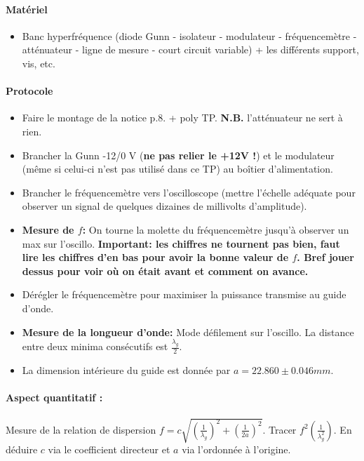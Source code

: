 \documentclass[11pt]{report}
\numberwithin{figure}{section}
\numberwithin{equation}{section}
\numberwithin{table}{section}
\newcommand{\1}{\boldsymbol{1}}
\begin{document}
\begin{tcolorbox}[breakable, enhanced, colback=red!2!white,colframe=mycolor!85!black,title=\textbf{\textbf{Expérience}}]
\paragraph*{Matériel}
\begin{itemize}
\item Banc hyperfréquence (diode Gunn - isolateur - modulateur - fréquencemètre - atténuateur - ligne de mesure - court circuit variable) + les différents support, vis, etc.
\end{itemize}

\paragraph*{Protocole } 

\begin{itemize}[label=$\triangleright$]
\item Faire le montage de la notice p.8. + poly TP. \textbf{N.B.} l'atténuateur ne sert à rien.
\item Brancher la Gunn -12/0 V (\textbf{ne pas relier le +12V !}) et le modulateur (même si celui-ci n'est pas utilisé dans ce TP) au boîtier d'alimentation. 
\item Brancher le fréquencemètre vers l'oscilloscope (mettre l'échelle adéquate pour observer un signal de quelques dizaines de millivolts d'amplitude).
\item \textbf{Mesure de $f$:} On tourne la molette du fréquencemètre jusqu'à observer un max sur l'oscillo. \textbf{Important: les chiffres ne tournent pas bien, faut lire les chiffres d'en bas pour avoir la bonne valeur de $f$. Bref jouer dessus pour voir où on était avant et comment on avance.}
\item Dérégler le fréquencemètre pour maximiser la puissance transmise au guide d'onde.
\item \textbf{Mesure de la longueur d'onde:} Mode défilement sur l'oscillo. La distance entre deux minima consécutifs est $\frac{\lambda_g}{2}$.
\item La dimension intérieure du guide est donnée par $a = 22.860 \pm 0.046 mm$.
\end{itemize}

\paragraph*{Aspect quantitatif :} Mesure de  la relation de dispersion $f = c \sqrt{(\frac{1}{\lambda_g})^2 + (\frac{1}{2a})^2}$. Tracer $f^2(\frac{1}{\lambda_g^2})$. En déduire $c$ via le coefficient directeur et $a$ via l'ordonnée à l'origine.


\end{tcolorbox}
\end{document}
